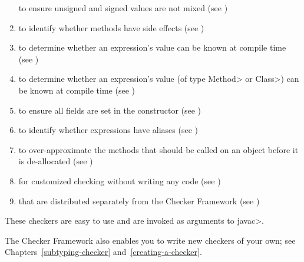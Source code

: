\begin{enumerate}
   to
  ensure unsigned and signed values are not mixed
  (see )
\item
   to identify whether
  methods have side effects (see )
\item
   to determine
  whether an expression's value can be known at compile time
  (see )
\item
   to determine
  whether an expression's value (of type \<Method> or \<Class>) can be known at compile time
  (see )
\item
   to ensure all
  fields are set in the constructor (see
  )
\item
   to identify whether
  expressions have aliases (see )
\item
   to over-approximate the
  methods that should be called on an object before it is de-allocated (see )
\item
   for customized checking without
  writing any code (see )
\item
   that are distributed
  separately from the Checker Framework
  (see )

\end{enumerate}

\noindent
These checkers are easy to use and are invoked as arguments to \<javac>.


The Checker Framework also enables you to write new checkers of your
own; see Chapters~\ref{subtyping-checker} and~\ref{creating-a-checker}.



